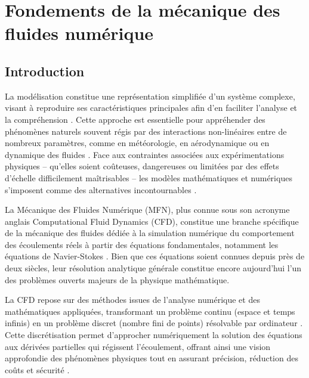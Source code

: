 \chapter{Fondements de la mécanique des fluides numérique}
\label{chap:fondements}

\section{Introduction}
\label{sec:introduction}

La modélisation constitue une représentation simplifiée d'un système complexe, visant à reproduire ses caractéristiques principales afin d'en faciliter l'analyse et la compréhension \cite{versteeg2007introduction}. Cette approche est essentielle pour appréhender des phénomènes naturels souvent régis par des interactions non-linéaires entre de nombreux paramètres, comme en météorologie, en aérodynamique ou en dynamique des fluides \cite{heller2011scale}. Face aux contraintes associées aux expérimentations physiques -- qu'elles soient coûteuses, dangereuses ou limitées par des effets d'échelle difficilement maîtrisables -- les modèles mathématiques et numériques s'imposent comme des alternatives incontournables \cite{ferziger2002computational}.

La Mécanique des Fluides Numérique (MFN), plus connue sous son acronyme anglais Computational Fluid Dynamics (CFD), constitue une branche spécifique de la mécanique des fluides dédiée à la simulation numérique du comportement des écoulements réels à partir des équations fondamentales, notamment les équations de Navier-Stokes \cite{roychowdhury2020computational}. Bien que ces équations soient connues depuis près de deux siècles, leur résolution analytique générale constitue encore aujourd'hui l'un des problèmes ouverts majeurs de la physique mathématique.

La CFD repose sur des méthodes issues de l'analyse numérique et des mathématiques appliquées, transformant un problème continu (espace et temps infinis) en un problème discret (nombre fini de points) résolvable par ordinateur \cite{patankar1980numerical}. Cette discrétisation permet d'approcher numériquement la solution des équations aux dérivées partielles qui régissent l'écoulement, offrant ainsi une vision approfondie des phénomènes physiques tout en assurant précision, réduction des coûts et sécurité \cite{tu2018computational}.

